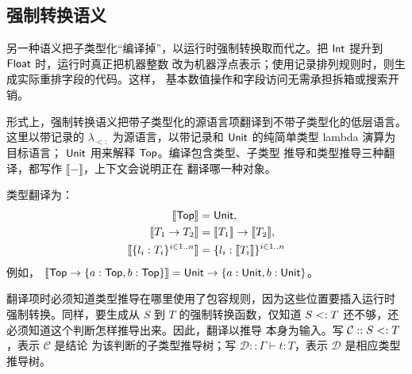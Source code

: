 \subsection*{强制转换语义}

另一种语义把子类型化“编译掉”，以运行时强制转换取而代之。把
\(\mathsf{Int}\) 提升到 \(\mathsf{Float}\) 时，运行时真正把机器整数
改为机器浮点表示；使用记录排列规则时，则生成实际重排字段的代码。这样，
基本数值操作和字段访问无需承担拆箱或搜索开销。

形式上，强制转换语义把带子类型化的源语言项翻译到不带子类型化的低层语言。
这里以带记录的 \(\lambda_{<:}\) 为源语言，以带记录和
\(\mathsf{Unit}\) 的纯简单类型 lambda 演算为目标语言；
\(\mathsf{Unit}\) 用来解释 \(\mathsf{Top}\)。编译包含类型、子类型
推导和类型推导三种翻译，都写作 \(\llbracket-\rrbracket\)，上下文会说明正在
翻译哪一种对象。

类型翻译为：
\[
\begin{aligned}
\llbracket\mathsf{Top}\rrbracket
  &=\mathsf{Unit},\\
\llbracket T_1\to T_2\rrbracket
  &=\llbracket T_1\rrbracket\to\llbracket T_2\rrbracket,\\
\llbracket\{l_i:T_i\}^{i\in1..n}\rrbracket
  &=\{l_i:\llbracket T_i\rrbracket\}^{i\in1..n}
\end{aligned}
\]
例如，
\(\llbracket\mathsf{Top}\to
\{a:\mathsf{Top},b:\mathsf{Top}\}\rrbracket=
\mathsf{Unit}\to\{a:\mathsf{Unit},b:\mathsf{Unit}\}\)。

翻译项时必须知道类型推导在哪里使用了包容规则，因为这些位置要插入运行时
强制转换。同样，要生成从 \(S\) 到 \(T\) 的强制转换函数，仅知道
\(S\mathrel{<:} T\) 还不够，还必须知道这个判断怎样推导出来。因此，翻译以推导
本身为输入。写 \(\mathcal C::S\mathrel{<:} T\)，表示 \(\mathcal C\) 是结论
为该判断的子类型推导树；写 \(\mathcal D::\Gamma\vdash t:T\)，表示
\(\mathcal D\) 是相应类型推导树。

